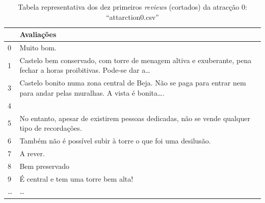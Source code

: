 \documentclass[a4paper,10pt]{article}
\begin{document}
\begin{table}[!ht]
  \centering
  \begin{adjustbox}{width=\columnwidth,center}
    \begin{tabular}{|l|l|}
      \hline
      ~      & Avaliações                                                                                                               \\ \hline
      0      & Muito bom.                                                                                                               \\ \hline
      1      & Castelo bem conservado, com torre de menagem altiva e exuberante, pena fechar a horas proibitivas. Pode-se dar a\ldots   \\ \hline
      3      & Castelo bonito numa zona central de Beja. Não se paga para entrar nem para andar pelas muralhas. A vista é bonita\ldots. \\ \hline
      4      & ~                                                                                                                        \\ \hline
      5      & No entanto, apesar de existirem pessoas dedicadas, não se vende qualquer tipo de recordações.                            \\ \hline
      6      & Também não é possível subir à torre o que foi uma desilusão.                                                             \\ \hline
      7      & A rever.                                                                                                                 \\ \hline
      8      & Bem preservado                                                                                                           \\ \hline
      9      & É central e tem uma torre bem alta!                                                                                      \\ \hline
      \ldots & \ldots                                                                                                                   \\ \hline
    \end{tabular}
  \end{adjustbox}
  \caption{Tabela representativa dos dez primeiros \textit{reviews} (cortados) da atracção 0: ``attarction0.csv''}
\end{table}
\end{document}

